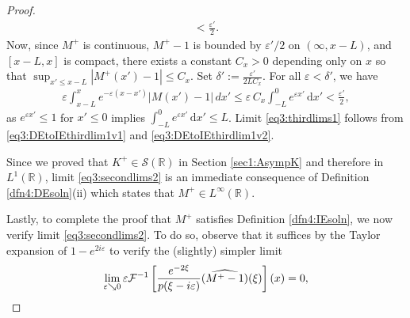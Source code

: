 \documentclass[../dissertation.tex]{subfiles}
\begin{document}
\begin{proof}
\begin{align}
			< \frac{\varepsilon'}{2}.
	\end{align}
	Now, since $M^+$ is continuous, $M^+-1$ is bounded by $\varepsilon'/2$ on $(\infty, x-L)$,
	and $[x-L, x]$ is compact, there exists a constant $C_x > 0$ depending only on $x$
	so that $\sup_{x'\leq x-L}|M^+(x')-1| \leq C_x$. 
	Set $\delta':= \frac{\varepsilon'}{2 L C_x}$.
	For all $\varepsilon < \delta'$, we have
	\begin{align} \label{eq3:DEtoIEthirdlim1v2}
		\varepsilon \int_{x-L}^{x} e^{-\varepsilon(x-x')} |M(x') - 1| \,dx'
			\leq \varepsilon \, C_x \int_{-L}^0 e^{\varepsilon x'} \, \mathrm{d}x'
			< \frac{\varepsilon'}{2},
	\end{align}
	as $e^{\varepsilon x'} \leq 1$ for $x' \leq 0$ implies 
	$\int_{-L}^0 e^{\varepsilon x'} \, \mathrm{d}x'\leq L$. Limit \eqref{eq3:thirdlims1} follows
	from \eqref{eq3:DEtoIEthirdlim1v1} and \eqref{eq3:DEtoIEthirdlim1v2}.

	Since we proved that $K^+\in \mathcal S(\mathbb R)$ in Section \ref{sec1:AsympK}
	and therefore in $L^1(\mathbb R)$, limit \eqref{eq3:secondlims2} is an 
	immediate consequence of Definition \ref{dfn4:DEsoln}(ii) which states
	that $M^+ \in L^\infty(\mathbb R)$.

	Lastly, to complete the proof that $M^+$ satisfies Definition \ref{dfn4:IEsoln}, 
	we now verify limit \eqref{eq3:secondlims2}. To do so, observe that 
	it suffices by the Taylor expansion of $1-e^{2i\varepsilon}$ 
	to verify the (slightly) simpler limit
	\begin{align}\label{eq3:simpler}
	 	\lim_{\varepsilon \searrow 0} 
				\varepsilon \mathcal F^{-1}
					\left[ 
						\frac{e^{-2\xi}}{p(\xi-i\varepsilon)} (\widehat{M^+-1})(\xi) 
					\right](x)
			= 0,
	\end{align} 


\end{proof}
\end{document}
